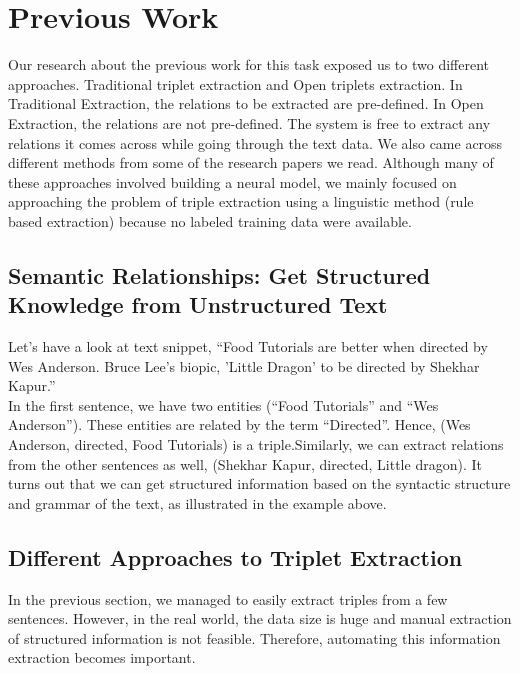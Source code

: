 \documentclass[11pt,letterpaper]{article}
\begin{document}
\section{Previous Work}
Our research about the previous work for this task exposed us to two different approaches. Traditional triplet extraction and Open triplets extraction. In Traditional Extraction, the relations to be extracted are pre-defined. In Open Extraction, the relations are not pre-defined. The system is free to extract any relations it comes across while going through the text data. We also came across different methods from some of the research papers we read. Although many of these approaches involved building a neural model, we mainly focused on approaching the problem of triple extraction using a linguistic method (rule based extraction) because no labeled training data were available.

\subsection{Semantic Relationships: Get Structured Knowledge from Unstructured Text}
Let's have a look at text snippet, “Food Tutorials are better when directed by Wes Anderson. Bruce Lee's biopic, 'Little Dragon' to be directed by Shekhar Kapur.” \\

In the first sentence, we have two entities (“Food Tutorials” and “Wes Anderson”). These entities are related by the term “Directed”. Hence, (Wes Anderson, directed, Food Tutorials) is a triple.Similarly, we can extract relations from the other sentences as well, (Shekhar Kapur, directed, Little dragon). It turns out that we can get structured information based on the syntactic structure and grammar of the text, as illustrated in the example above.

\subsection{Different Approaches to Triplet Extraction}
In the previous section, we managed to easily extract triples from a few sentences. However, in the real world, the data size is huge and manual extraction of structured information is not feasible. Therefore, automating this information extraction becomes important.\\
\end{document}

